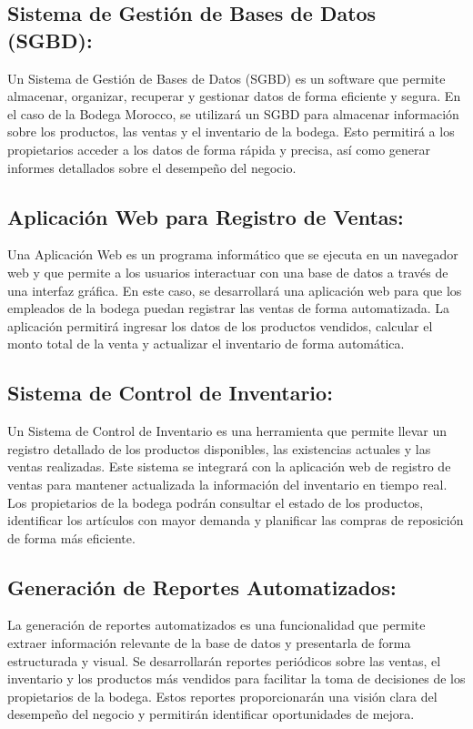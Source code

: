 \documentclass{article}
\begin{document}
  \subsection{Sistema de Gestión de Bases de Datos (SGBD):}

    Un Sistema de Gestión de Bases de Datos (SGBD) es un software que permite almacenar, organizar, recuperar y gestionar datos de forma eficiente y segura. En el caso de la Bodega Morocco, se utilizará un SGBD para almacenar información sobre los productos, las ventas y el inventario de la bodega. Esto permitirá a los propietarios acceder a los datos de forma rápida y precisa, así como generar informes detallados sobre el desempeño del negocio.

  \subsection{Aplicación Web para Registro de Ventas:}

    Una Aplicación Web es un programa informático que se ejecuta en un navegador web y que permite a los usuarios interactuar con una base de datos a través de una interfaz gráfica. En este caso, se desarrollará una aplicación web para que los empleados de la bodega puedan registrar las ventas de forma automatizada. La aplicación permitirá ingresar los datos de los productos vendidos, calcular el monto total de la venta y actualizar el inventario de forma automática.

  \subsection{Sistema de Control de Inventario:}

    Un Sistema de Control de Inventario es una herramienta que permite llevar un registro detallado de los productos disponibles, las existencias actuales y las ventas realizadas. Este sistema se integrará con la aplicación web de registro de ventas para mantener actualizada la información del inventario en tiempo real. Los propietarios de la bodega podrán consultar el estado de los productos, identificar los artículos con mayor demanda y planificar las compras de reposición de forma más eficiente.

  \subsection{Generación de Reportes Automatizados:}

    La generación de reportes automatizados es una funcionalidad que permite extraer información relevante de la base de datos y presentarla de forma estructurada y visual. Se desarrollarán reportes periódicos sobre las ventas, el inventario y los productos más vendidos para facilitar la toma de decisiones de los propietarios de la bodega. Estos reportes proporcionarán una visión clara del desempeño del negocio y permitirán identificar oportunidades de mejora.
\end{document}
